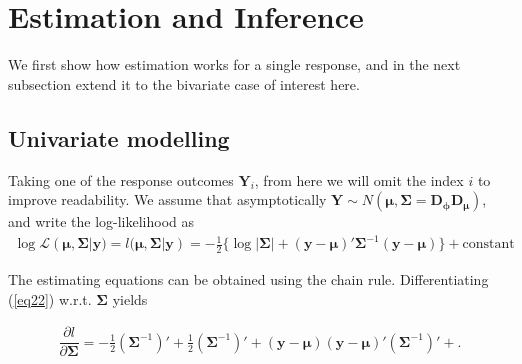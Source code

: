 \documentclass[useAMS,referee]{biom}
\begin{document}
\section{Estimation and Inference}

We first show how estimation works for a single response, and in the next subsection extend it to the bivariate case of interest here. 

\subsection{Univariate modelling}\label{univariate}

Taking one of the response outcomes $\mathbf {Y} _i $, from here we will omit the index $ i $ to improve readability. We assume that asymptotically  $\boldsymbol{Y} \sim N({\boldsymbol{\mu}},\boldsymbol{\Sigma}= \mathbf{D_\phi}\mathbf{D_\mu})$, and write the log-likelihood as
\begin{equation}\label{eq22}
\begin{array}{l}
\log \mathcal{L}(\boldsymbol{\mu},\boldsymbol{\Sigma}| \mathbf{y})= l(\boldsymbol{\mu},\boldsymbol{\Sigma}| \mathbf{y})= -\frac{1}{2}\{\log |\boldsymbol{\Sigma}| +  (\mathbf{y}-\boldsymbol{\mu})'\boldsymbol{\Sigma}^{-1} (\mathbf{y}-\boldsymbol{\mu})\} + \mbox{constant}





\end{array}
\end{equation}

The estimating equations can be obtained using the chain rule. Differentiating (\ref{eq22}) w.r.t. $\boldsymbol{\Sigma}$ yields 

\begin{equation}\label{eq4}
\begin{array}{l}
\dfrac{\partial l}{\partial \boldsymbol{\Sigma}} = -\frac{1}{2}(\boldsymbol{\Sigma}^{-1})'+\frac{1}{2}(\boldsymbol{\Sigma}^{-1})'+(\mathbf{y}-\boldsymbol{\mu})(\mathbf{y}-\boldsymbol{\mu})'(\boldsymbol{\Sigma}^{-1})'+.

\end{array}
\end{equation}
\end{document}
